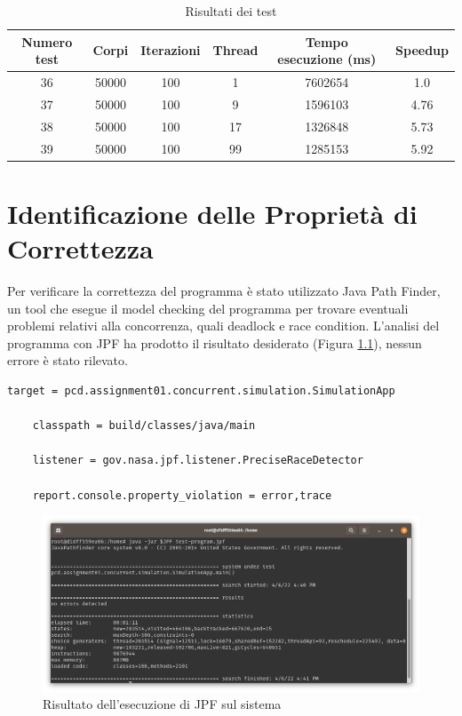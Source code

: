 \documentclass[12pt,a4paper,openright,twoside]{book}
\begin{document}
\begin{table}[h!]
	\centering
	\begin{tabular}{ |c|c|c|c|c|c| } 
		\hline
			Numero test & Corpi & Iterazioni & Thread & Tempo esecuzione (ms) & Speedup \\
		\hline
		36 & 50000 & 100 & 1 & 7602654 & 1.0 \\ 
		\hline
		37 & 50000 & 100 & 9 & 1596103 & 4.76 \\ 
		\hline
		38 & 50000 & 100 & 17 & 1326848 & 5.73 \\ 
		\hline
		39 & 50000 & 100 & 99 & 1285153 & 5.92 \\ 
		\hline
	\end{tabular}
	\caption{Risultati dei test}
	\label{tab:table2}
\end{table}

\chapter{Identificazione delle Proprietà di Correttezza} %
\label{chap:Identificazione delle Proprietà di Correttezza}
Per verificare la correttezza del programma è stato utilizzato Java Path Finder,
un tool che esegue il model checking del programma per trovare eventuali problemi relativi alla concorrenza,
quali deadlock e race condition.
L'analisi del programma con JPF ha prodotto il risultato desiderato (Figura \ref{fig:jpf-test}), nessun errore è stato rilevato.

\begin{lstlisting}[label=lst:jpf-file,caption=File JPF]
	target = pcd.assignment01.concurrent.simulation.SimulationApp

	classpath = build/classes/java/main
	
	listener = gov.nasa.jpf.listener.PreciseRaceDetector
	
	report.console.property_violation = error,trace
\end{lstlisting}


\begin{figure}
	\centering
	\includegraphics[width=\linewidth]{figures/jpf-test.png}
	\caption{Risultato dell'esecuzione di JPF sul sistema}
	\label{fig:jpf-test}
\end{figure}
\end{document}
